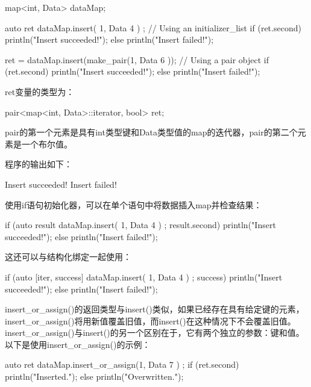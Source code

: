 \begin{cpp}
map<int, Data> dataMap;

auto ret { dataMap.insert({ 1, Data { 4 } }) }; // Using an initializer_list
if (ret.second) { println("Insert succeeded!"); }
else { println("Insert failed!"); }

ret = dataMap.insert(make_pair(1, Data { 6 })); // Using a pair object
if (ret.second) { println("Insert succeeded!"); }
else { println("Insert failed!"); }
\end{cpp}

ret变量的类型为：

\begin{cpp}
pair<map<int, Data>::iterator, bool> ret;
\end{cpp}

pair的第一个元素是具有int类型键和Data类型值的map的迭代器，pair的第二个元素是一个布尔值。

程序的输出如下：

\begin{shell}
Insert succeeded!
Insert failed!
\end{shell}

使用if语句初始化器，可以在单个语句中将数据插入map并检查结果：

\begin{cpp}
if (auto result { dataMap.insert({ 1, Data { 4 } }) }; result.second) {
    println("Insert succeeded!");
} else {
    println("Insert failed!");
}
\end{cpp}

这还可以与结构化绑定一起使用：

\begin{cpp}
if (auto [iter, success] { dataMap.insert({ 1, Data { 4 } }) }; success) {
    println("Insert succeeded!");
} else {
    println("Insert failed!");
}
\end{cpp}


insert\_or\_assign()的返回类型与insert()类似，如果已经存在具有给定键的元素，insert\_or\_assign()将用新值覆盖旧值，而insert()在这种情况下不会覆盖旧值。insert\_or\_assign()与insert()的另一个区别在于，它有两个独立的参数：键和值。以下是使用insert\_or\_assign()的示例：

\begin{cpp}
auto ret { dataMap.insert_or_assign(1, Data { 7 }) };
if (ret.second) { println("Inserted."); }
else { println("Overwritten."); }
\end{cpp}


